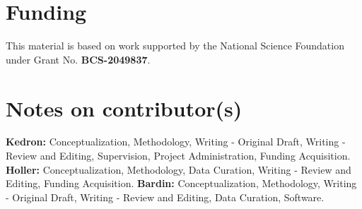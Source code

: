 \documentclass[]{interact}
\theoremstyle{plain}%
\theoremstyle{definition}
\theoremstyle{remark}
\begin{document}
\section*{Funding}
This material is based on work supported by the National Science Foundation under Grant No. \textbf{BCS-2049837}.

\section*{Notes on contributor(s)}
\textbf{Kedron:} Conceptualization, Methodology, Writing - Original Draft, Writing - Review and Editing, Supervision, Project Administration, Funding Acquisition. \textbf{Holler:} Conceptualization, Methodology, Data Curation, Writing - Review and Editing, Funding Acquisition. \textbf{Bardin:} Conceptualization, Methodology, Writing - Original Draft, Writing - Review and Editing, Data Curation, Software.
\end{document}
